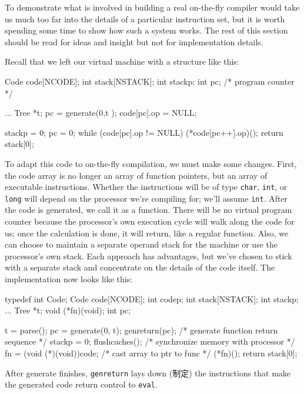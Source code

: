 To demonstrate what is involved in building a real on-the-fly compiler
would take us much too far into the details of a particular instruction
set, but it is worth spending some time to show how such a system works.
The rest of this section should be read for ideas and insight but not for
implementation details.

Recall that we left our virtual machine with a structure like this:
\begin{wellcode}
    Code code[NCODE];
    int stack[NSTACK];
    int stackp;
    int pc; /* program counter */

        ...
        Tree    *t;
        pc = generate(0,t );
        code[pc].op = NULL;

        stackp = 0;
        pc = 0;
        while (code[pc].op != NULL)
            (*code[pc++].op)();
        return stack[0];
\end{wellcode}

To adapt this code to on-the-fly compilation, we must make some changes.
First, the code array is no longer an array of function pointers, but an
array of executable instructions. Whether the instructions will be of type
\verb'char', \verb'int', or \verb'long' will depend on the processor we're
compiling for; we'll assume \verb'int'. After the code is generated, we
call it as a function. There will be no virtual program counter because the
processor's own execution cycle will walk along the code for us; once the
calculation is done, it will return, like a regular function. Also, we can
choose to maintain a separate operand stack for the machine or use the
processor's own stack. Each approach has advantages, but we've chosen to
stick with a separate stack and concentrate on the details of the code
itself. The implementation now looks like this:
\begin{wellcode}
    typedef int Code;
    Code    code[NCODE];
    int codep;
    int stack[NSTACK];
    int stackp;
        ...
        Tree *t;
        void (*fn)(void);
        int pc;

        t = parse();
        pc = generate(0, t);
        genreturn(pc);      /* generate function return sequence */
        stackp = 0;
        flushcaches();      /* synchronize memory with processor */
        fn = (void (*)(void))code;  /* cast array to ptr to func */
        (*fn)();
        return stack[0];
\end{wellcode}

After generate finishes, \verb'genreturn' lays down (制定) the instructions
that make the generated code return control to \verb'eval'.

